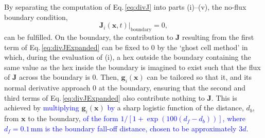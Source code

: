 \documentclass[9pt,lineno,draft]{elife}
\newcommand{\cmnt}[1]{\textcolor{blue}{#1}}
\newcommand{\mb}[1]{\mathbf{#1}}
\begin{document}
By separating the computation of Eq.\,\ref{eq:divJ} into parts (i)--(v), the
no-flux boundary condition,
%
\begin{equation}
  \label{eq:noflux}
  \mb{J}_i(\mb{x},t)\big\rvert_{\mathrm{boundary}} = 0,
\end{equation}
%
can be fulfilled. On
the boundary, the contribution to $\mb{J}$ resulting from the first term of
Eq.\,\ref{eq:divJExpanded} can be fixed to 0 by the `ghost cell method' in
which, during the evaluation of (i), a hex outside the boundary containing the
same value as the hex inside the boundary is imagined to exist such that the
flux of $\mb{J}$ across the boundary is 0. Then, $\mb{g}_i(\mb{x})$ can be
tailored so that it, and its normal derivative approach 0 at the boundary,
ensuring that the second and third terms of Eq.\,\ref{eq:divJExpanded} also
contribute nothing to $\mb{J}$. This is achieved by \cmnt{multiplying}
$\mb{g}_i(\mb{x})$ \cmnt{by} a sharp logistic function of the distance, $d_b$,
from $\mb{x}$ to the boundary, \cmnt{of the form $1/[1 +
  \exp(100(d_f-d_b))]$, where $d_f=0.1$\,mm is the boundary fall-off distance,
  chosen to be approximately $3d$}.
\end{document}
